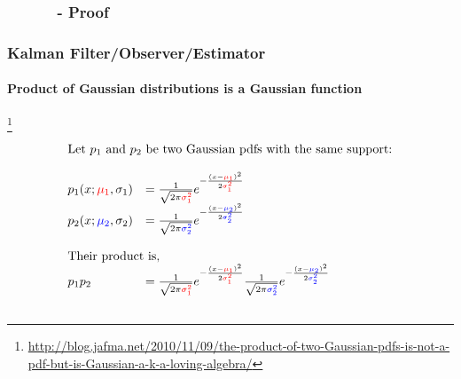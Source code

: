 \subsubsection{\ \ \ \ \ \ - Proof}
\begin{frame}
\frametitle{Kalman Filter/Observer/Estimator}
\framesubtitle{Product of Gaussian distributions is a Gaussian function}

\footnote{\tiny\hspace{-0.23in} \hspace{-0.25in}
\href{http://blog.jafma.net/2010/11/09/the-product-of-two-Gaussian-pdfs-is-not-a-pdf-but-is-Gaussian-a-k-a-loving-algebra/}{http://blog.jafma.net/2010/11/09/the-product-of-two-Gaussian-pdfs-is-not-a-pdf-but-is-Gaussian-a-k-a-loving-algebra/}}
\scriptsize
\begin{equation*}
\begin{array}{llll}
\multicolumn{2}{l}{\textrm{Let $p_1$ and $p_2$ be two Gaussian pdfs with the same support:}}\\\\
p_1(x; \muone, \sone)&=\frac{1}{\sqrt{2 \pi \varone}} e^{-\frac{(x-\muone)^2}{2 \varone}}\\
p_2(x; \mutwo, \stwo)&=\frac{1}{\sqrt{2 \pi \vartwo}} e^{-\frac{(x-\mutwo)^2}{2 \vartwo}}\\\\

\multicolumn{2}{l}{\textrm{Their product is,}}\\
p_1p_2 &=     \frac{1}{\sqrt{2 \pi \varone}} e^{-\frac{(x-\muone)^2}{2 \varone}}    \frac{1}{\sqrt{2 \pi \vartwo}} e^{-\frac{(x-\mutwo)^2}{2 \vartwo}}\\\\
\end{array}
\end{equation*}
\end{frame}




